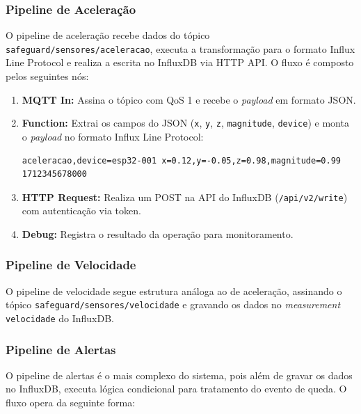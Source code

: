 \documentclass[a4paper,12pt]{article}
\begin{document}
\subsubsection{Pipeline de Aceleração}

O pipeline de aceleração recebe dados do tópico \texttt{safeguard/sensores/aceleracao}, executa a transformação para o formato Influx Line Protocol e realiza a escrita no InfluxDB via HTTP API. O fluxo é composto pelos seguintes nós:

\begin{enumerate}[leftmargin=2cm]
    \item \textbf{MQTT In:} Assina o tópico com QoS 1 e recebe o \textit{payload} em formato JSON.
    \item \textbf{Function:} Extrai os campos do JSON (\texttt{x}, \texttt{y}, \texttt{z}, \texttt{magnitude}, \texttt{device}) e monta o \textit{payload} no formato Influx Line Protocol:
    \begin{lstlisting}[language={},caption={Formato Influx Line Protocol para aceleração.},label={lst:line-protocol}]
aceleracao,device=esp32-001 x=0.12,y=-0.05,z=0.98,magnitude=0.99 1712345678000
    \end{lstlisting}
    \item \textbf{HTTP Request:} Realiza um POST na API do InfluxDB (\texttt{/api/v2/write}) com autenticação via token.
    \item \textbf{Debug:} Registra o resultado da operação para monitoramento.
\end{enumerate}

\subsubsection{Pipeline de Velocidade}

O pipeline de velocidade segue estrutura análoga ao de aceleração, assinando o tópico \texttt{safeguard/sensores/velocidade} e gravando os dados no \textit{measurement} \texttt{velocidade} do InfluxDB.

\subsubsection{Pipeline de Alertas}

O pipeline de alertas é o mais complexo do sistema, pois além de gravar os dados no InfluxDB, executa lógica condicional para tratamento do evento de queda. O fluxo opera da seguinte forma:
\end{document}
